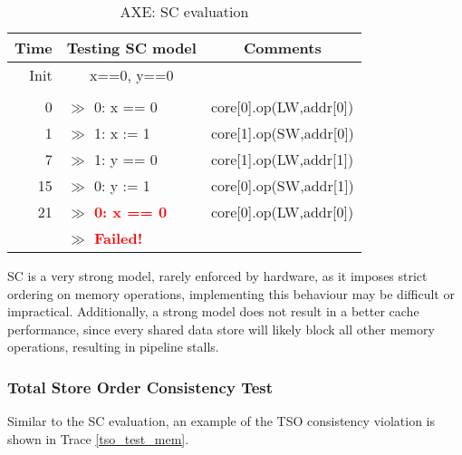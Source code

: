 			\captionsetup[table]{name=Trace}
			\begin{table}[!h]
			\begin{center}
			\selectfont
			\begin{tabular}{|r|l|l|}
				\hline
				\textbf{Time} & \textbf{Testing SC model} & \multicolumn{1}{c|}{\textbf{Comments}} \\
				\hline 
				Init & \multicolumn{1}{c|}{x==0, y==0} & \\
				& & \\
				0 & $\gg$ 0: x == 0 & core[0].op(LW,addr[0]) \\	
				1 & $\gg$ 1: x := 1 & core[1].op(SW,addr[0]) \\
				7 & $\gg$ 1: y == 0 & core[1].op(LW,addr[1]) \\
				15 & $\gg$ 0: y := 1 & core[0].op(SW,addr[1]) \\
				21 & $\gg$ \textbf{\textcolor{Red}{0: x == 0}} & core[0].op(LW,addr[0]) \\
				& $\gg$ \textbf{\textcolor{Red}{Failed!}} & \\
				\hline
			\end{tabular}
			\caption{AXE: SC evaluation}
			\label{sc_test_mem}
			\end{center} 
			\end{table}
			\captionsetup[table]{name=Table}

			\begin{comment}
			setAddrMap(< 8,  7,  2,  1>)
			chooseVars(<V 0x6 0xf 0xe 0x0  >)
			2061: core[0].op(LW,'h3)
			2062: core[2].op(SW,'h3)
			2068: core[2].op(LW,'h0)
			2076: core[0].op(SW,'h0)
			2082: core[0].op(LW,'h3)
			0: v0 == 0
			2: v0 := 10
			2: v6 == 0
			0: v6 := 8
			0: v0 == 0
			Failed!
			
			\end{comment}

			SC is a very strong model, rarely enforced by hardware, as it imposes strict ordering on memory operations, implementing this behaviour may be difficult or impractical. Additionally, a strong model does not result in a better cache performance, since every shared data store will likely block all other memory operations, resulting in pipeline stalls.

		\subsubsection{Total Store Order Consistency Test}
			Similar to the SC evaluation, an example of the TSO consistency violation is shown in Trace \ref{tso_test_mem}.
			
